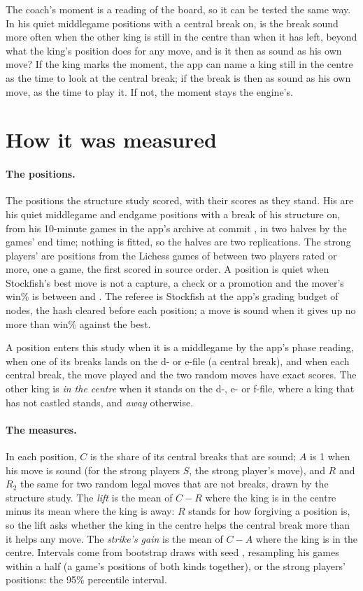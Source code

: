 \documentclass[11pt]{article}
\begin{document}
The coach's moment is a reading of the board, so it can be tested the same way. In his quiet
middlegame positions with a central break on, is the break sound more often when the other king
is still in the centre than when it has left, beyond what the king's position does for any move,
and is it then as sound as his own move? If the king marks the moment, the app can name a king
still in the centre as the time to look at the central break; if the break is then as sound as
his own move, as the time to play it. If not, the moment stays the engine's.

\section{How it was measured}

\paragraph{The positions.} The positions the structure study scored, with their scores as they
stand. His are his quiet middlegame and endgame positions with a break of his structure on, from
his 10-minute games in the app's archive at commit \texttt{\AppCommit}, in two halves by the
games' end time; nothing is fitted, so the halves are two replications. The strong players' are
positions from the Lichess games of \MonthName{} between two players rated \Floor{} or more, one a
game, the first \StrongScored{} scored in source order. A position is quiet when Stockfish's best
move is not a capture, a check or a promotion and the mover's win\% is between \WinLow{} and \WinHigh. The
referee is Stockfish at the app's grading budget of \GradeNodes{} nodes, the hash cleared before
each position; a move is sound when it gives up no more than \Window{} win\% against the best.

A position enters this study when it is a middlegame by the app's phase reading, when one of its
breaks lands on the d- or e-file (a central break), and when each central break, the move played
and the two random moves have exact scores. The other king is \emph{in the centre} when it stands
on the d-, e- or f-file, where a king that has not castled stands, and \emph{away} otherwise.

\paragraph{The measures.} In each position, $C$ is the share of its central breaks that are sound;
$A$ is 1 when his move is sound (for the strong players $S$, the strong player's move), and $R$
and $R_2$ the same for two random legal moves that are not breaks, drawn by the structure study.
The \emph{lift} is the mean of $C - R$ where the king is in the centre minus its mean where the
king is away: $R$ stands for how forgiving a position is, so the lift asks whether the king in the
centre helps the central break more than it helps any move. The \emph{strike's gain} is the mean
of $C - A$ where the king is in the centre. Intervals come from \Draws{} bootstrap draws with seed
\Seed, resampling his games within a half (a game's positions of both kinds together), or the
strong players' positions: the 95\% percentile interval.
\end{document}
